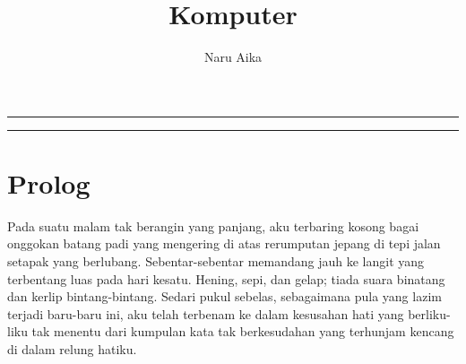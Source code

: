 \documentclass[smalldemyvopaper,11pt,twoside,onecolumn,openright,extrafontsizes]{memoir}
\title{Komputer}
\author{Naru Aika}
\newcommand{\ISBN}{0-000-00000-2}
\newcommand{\press}{}
\newcommand*\halftitlepage{\begingroup %
  \setlength\drop{0.1\textheight}
  \begin{center}
  \vspace*{\drop}
  \rule{\textwidth}{0in}\par
  {\Large\textsc\thetitle\par}
  \rule{\textwidth}{0in}\par
  \vfill
  \end{center}
\endgroup}
\newlength\drop{}
\newcommand*\titleM{\begingroup %
  \setlength\drop{0.15\textheight}
  \begin{center}
  \vspace*{\drop}
  \rule{\textwidth}{0in}\par
  {\HUGE\textsc\thetitle\par}
  \rule{\textwidth}{0in}\par
  {\Large\textit\theauthor\par}
  \vfill
  {\Large\scshape\press}
  \end{center}
\endgroup}
\begin{document}
\pagestyle{empty}
\titleM{}
\clearpage


\frontmatter{}
\pagestyle{mystyle}

\mainmatter{}

\chapter*{Prolog}


Pada suatu malam tak berangin yang panjang, aku terbaring kosong bagai onggokan batang padi yang mengering di atas rerumputan jepang di tepi jalan setapak yang berlubang. Sebentar-sebentar memandang jauh ke langit yang terbentang luas pada hari kesatu. Hening, sepi, dan gelap; tiada suara binatang dan kerlip bintang-bintang. Sedari pukul sebelas, sebagaimana pula yang lazim terjadi baru-baru ini, aku telah terbenam ke dalam kesusahan hati yang berliku-liku tak menentu dari kumpulan kata tak berkesudahan yang terhunjam kencang di dalam relung hatiku.
\end{document}
